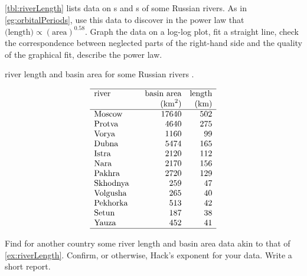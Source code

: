 \begin{exercise} \label{ex:riverLength} 
\autoref{tbl:riverLength} lists data on s and s of some Russian rivers. 
As in \autoref{eg:orbitalPeriods}, use this data to discover  in the power law that \(\text{(length)}\propto(\text{area})^{0.58}\).  
Graph the data on a log-log plot, fit a straight line, check the correspondence between neglected parts of the right-hand side and the quality of the graphical fit, describe the power law.
\setbox\ajrqrbox\hbox{}%
\marginpar{\usebox{\ajrqrbox\\[2ex]}}%
\begin{table}
\caption{river length and basin area for some Russian rivers \cite[p.154]{Arnold2014}.}
\label{tbl:riverLength}
\begin{equation*}
\begin{array}{p{12ex}rr} \hline
river&\text{basin area}&\text{length}\\
&(\text{km}^2)&\text{(km)}\\\hline
Moscow& 17640 & 502 \\
Protva& 4640 & 275 \\
Vorya& 1160 & 99 \\
Dubna& 5474 & 165 \\
Istra& 2120 & 112 \\
Nara& 2170 & 156 \\
Pakhra& 2720 & 129 \\
Skhodnya& 259 & 47 \\
Volgusha& 265 & 40 \\
Pekhorka& 513 & 42 \\
Setun& 187 & 38 \\
Yauza& 452 & 41 \\
\hline
\end{array}
\end{equation*}
\end{table}%
\end{exercise}

\begin{exercise} \label{ex:riverLength2} 
Find for another country some river length and basin area data akin to that of \autoref{ex:riverLength}.
Confirm, or otherwise, Hack's exponent for your data.  
Write a short report.
\end{exercise}


